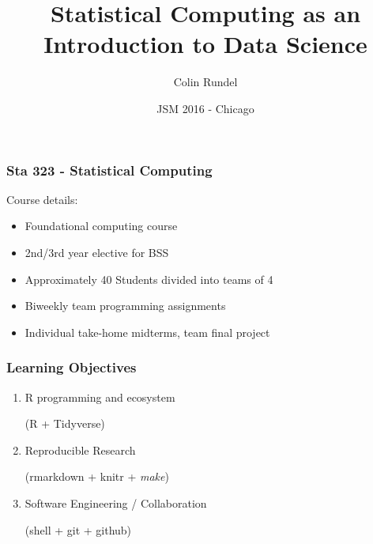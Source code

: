 \documentclass[12pt]{beamer}
\title{Statistical Computing as an Introduction to Data Science}
\subtitle{}
\date{JSM 2016 - Chicago}
\author{Colin Rundel}
\institute{Duke University\\Department of Statistical Science}
\begin{document}
\maketitle


\begin{frame}
\frametitle{Sta 323 - Statistical Computing}

Course details:
\begin{itemize}
\item Foundational computing course
\vspace{2mm}
\item 2nd/3rd year elective for BSS
\vspace{2mm}
\item Approximately 40 Students divided into teams of 4
\vspace{2mm}
\item Biweekly team programming assignments
\vspace{2mm}
\item Individual take-home midterms, team final project
\end{itemize}

\end{frame}


\begin{frame}
\frametitle{Learning Objectives}

{\large
\begin{enumerate}
 
\item R programming and ecosystem \\
      \begin{center} {\small (R + Tidyverse)} \end{center}

\vspace{5mm}

\item Reproducible Research \\
      \begin{center} {\small (rmarkdown + knitr + \emph{make})} \end{center}

\vspace{5mm}

\item Software Engineering / Collaboration \\
      \begin{center} {\small (shell + git + github)} \end{center}

\end{enumerate}
}
\end{frame}
\end{document}
